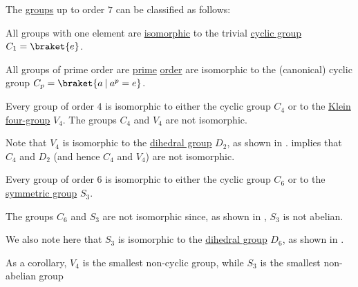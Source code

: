 \begin{proposition}\label{thm:clasification_of_small_groups}
  The \hyperref[def:group]{groups} up to order \( 7 \) can be classified as follows:
  \begin{thmenum}
     All groups with one element are \hyperref[def:group/homomorphism]{isomorphic} to the trivial \hyperref[def:cyclic_group]{cyclic group} \( C_1 = \braket{ e } \).

     All groups of prime order are \hyperref[def:prime_number]{prime} \hyperref[def:group_order]{order} are isomorphic to the (canonical) cyclic group \( C_p = \braket{ a \given a^p = e } \).

     Every group of order \( 4 \) is isomorphic to either the cyclic group \( C_4 \) or to the \hyperref[def:klein_four_group]{Klein four-group} \( V_4 \). The groups \( C_4 \) and \( V_4 \) are not isomorphic.

    Note that \( V_4 \) is isomorphic to the \hyperref[def:dihedral_group]{dihedral group} \( D_2 \), as shown in .  implies that \( C_4 \) and \( D_2 \) (and hence \( C_4 \) and \( V_4 \)) are not isomorphic.

     Every group of order \( 6 \) is isomorphic to either the cyclic group \( C_6 \) or to the \hyperref[def:symmetric_group]{symmetric group} \( S_3 \).

    The groups \( C_6 \) and \( S_3 \) are not isomorphic since, as shown in , \( S_3 \) is not abelian.

    We also note here that \( S_3 \) is isomorphic to the \hyperref[def:dihedral_group]{dihedral group} \( D_6 \), as shown in .
  \end{thmenum}
\end{proposition}
\begin{comments}
  \item As a corollary, \( V_4 \) is the smallest non-cyclic group, while \( S_3 \) is the smallest non-abelian group
\end{comments}
